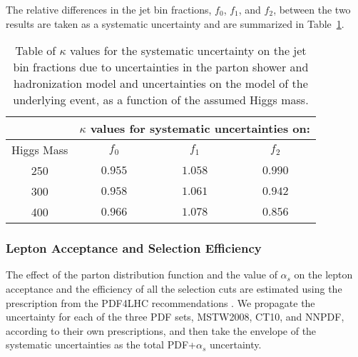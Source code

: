 The relative differences in the jet bin fractions, $f_{0}$, $f_{1}$, and $f_{2}$, between the two results are taken as a systematic
uncertainty and are summarized in Table~\ref{tab:JetBinFractionSystematics_PartonShower}.


\begin{table}[!htbp]
\begin{center}
\begin{tabular}{|c|c|c|c|}

\hline
               &   \multicolumn{3}{|c|}{ $\kappa$ values for systematic uncertainties on: } \\
\hline
Higgs Mass     &   $f_{0}$   &  $f_{1}$       &   $f_{2}$       \\
\hline
250 & $0.955$ & $1.058$ & $0.990$ \\
300 & $0.958$ & $1.061$ & $0.942$ \\
400 & $0.966$ & $1.078$ & $0.856$ \\
\hline
\end{tabular}
\caption{Table of $\kappa$ values for the systematic uncertainty on the jet bin fractions
due to  uncertainties in the parton shower and hadronization model and uncertainties
on the model of the underlying event, as a function of the assumed Higgs mass.  }
\label{tab:JetBinFractionSystematics_PartonShower}
\end{center}
\end{table}



\subsubsection{Lepton Acceptance and Selection Efficiency }

The effect of the parton distribution function and the value of $\alpha_{s}$
 on the lepton acceptance and the efficiency of all the selection cuts are 
estimated using the prescription from the PDF4LHC recommendations \cite{PDF4LHC}. We 
propagate the uncertainty for each of the three PDF sets, MSTW2008, CT10, and
NNPDF, according to their own prescriptions, and then take the envelope
of the systematic uncertainties as the total PDF+$\alpha_{s}$  uncertainty. 

